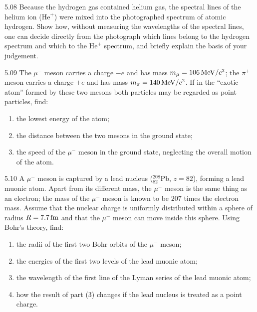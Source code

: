 \begin{problem}{5.08}
Because the hydrogen gas contained helium gas, the spectral lines of the helium ion ($\mathrm{He}^+$) were mixed into the photographed spectrum of atomic hydrogen. Show how, without measuring the wavelengths of the spectral lines, one can decide directly from the photograph which lines belong to the hydrogen spectrum and which to the $\mathrm{He}^+$ spectrum, and briefly explain the basis of your judgement.
\end{problem}

\begin{problem}{5.09}
The $\mu^-$ meson carries a charge $-e$ and has mass $m_\mu = 106\,\mathrm{MeV}/c^2$; the $\pi^+$ meson carries a charge $+e$ and has mass $m_\pi = 140\,\mathrm{MeV}/c^2$. If in the ``exotic atom'' formed by these two mesons both particles may be regarded as point particles, find:
\begin{enumerate}[label=(\arabic*),leftmargin=2.2em,itemsep=1pt,topsep=2pt]
\item the lowest energy of the atom;
\item the distance between the two mesons in the ground state;
\item the speed of the $\mu^-$ meson in the ground state, neglecting the overall motion of the atom.
\end{enumerate}
\end{problem}

\begin{problem}{5.10}
A $\mu^-$ meson is captured by a lead nucleus ($^{208}_{82}\mathrm{Pb}$, $z = 82$), forming a lead muonic atom. Apart from its different mass, the $\mu^-$ meson is the same thing as an electron; the mass of the $\mu^-$ meson is known to be $207$ times the electron mass. Assume that the nuclear charge is uniformly distributed within a sphere of radius $R = 7.7\,\mathrm{fm}$ and that the $\mu^-$ meson can move inside this sphere. Using Bohr's theory, find:
\begin{enumerate}[label=(\arabic*),leftmargin=2.2em,itemsep=1pt,topsep=2pt]
\item the radii of the first two Bohr orbits of the $\mu^-$ meson;
\item the energies of the first two levels of the lead muonic atom;
\item the wavelength of the first line of the Lyman series of the lead muonic atom;
\item how the result of part (3) changes if the lead nucleus is treated as a point charge.
\end{enumerate}
\end{problem}


